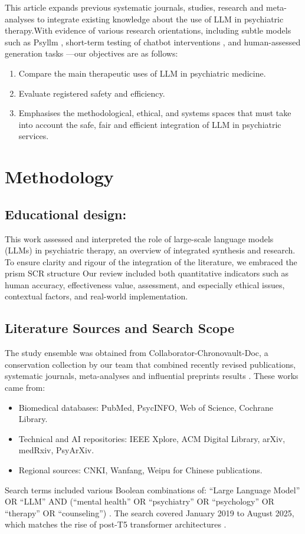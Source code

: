 \documentclass[journal]{IEEEtran}
\begin{document}
This article expands previous systematic journals, studies, research and meta-analyses to integrate existing knowledge about the use of LLM in psychiatric therapy.With evidence of various research orientations, including subtle models such as Psyllm  \cite{Hu2025}, short-term testing of chatbot interventions \cite{Zhong2024}, and human-assessed generation tasks \cite{Hua2024b}—our objectives are as follows: 
\begin{enumerate}
    \item Compare the main therapeutic uses of LLM in psychiatric medicine.
    \item Evaluate registered safety and efficiency.
    \item Emphasises the methodological, ethical, and systems spaces that must take into account the safe, fair and efficient integration of LLM in psychiatric services.
\end{enumerate}

\section{Methodology}
\subsection{Educational design:}
This work assessed and interpreted the role of large-scale language models (LLMs) in psychiatric therapy, an overview of integrated synthesis and research. To ensure clarity and rigour of the integration of the literature, we embraced the prism SCR structure  \citep{tricco2018prismascr} Our review included both quantitative indicators such as human accuracy, effectiveness value, assessment, and especially ethical issues, contextual factors, and real-world implementation.

\subsection{Literature Sources and Search Scope}
The study ensemble was obtained from Collaborator-Chronovault-Doc, a conservation collection by our team that combined recently revised publications, systematic journals, meta-analyses and influential preprints results \cite{Hua2024b,JMIR2024,Zhong2024}. These works came from:
\begin{itemize}
    \item Biomedical databases: PubMed, PsycINFO, Web of Science, Cochrane Library.
    \item Technical and AI repositories: IEEE Xplore, ACM Digital Library, arXiv, medRxiv, PsyArXiv.
    \item Regional sources: CNKI, Wanfang, Weipu for Chinese publications.
\end{itemize}
Search terms included various Boolean combinations of:
``Large Language Model'' OR ``LLM'' AND (``mental health'' OR ``psychiatry'' OR ``psychology'' OR ``therapy'' OR ``counseling'') \cite{Ibrahimov2024,Olawade2024}.  
The search covered January 2019 to August 2025, which matches the rise of post-T5 transformer architectures \cite{raffel2020t5}.
\end{document}
